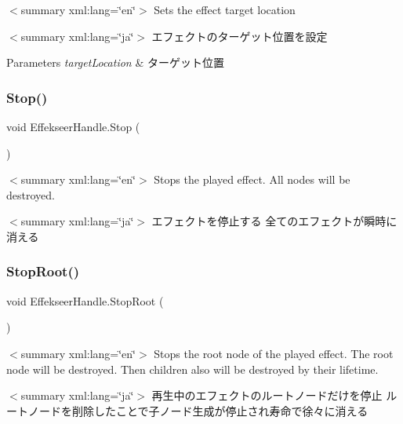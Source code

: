 $<$summary xml\+:lang=\char`\"{}en\char`\"{}$>$ Sets the effect target location 

$<$summary xml\+:lang=\char`\"{}ja\char`\"{}$>$ エフェクトのターゲット位置を設定 


\begin{DoxyParams}{Parameters}
{\em target\+Location} & ターゲット位置\\
\hline
\end{DoxyParams}
\mbox{\label{struct_effekseer_handle_add31723e9d75fad60015c48dfe1bf785}} 
\subsubsection{\texorpdfstring{Stop()}{Stop()}}
{\footnotesize\ttfamily void Effekseer\+Handle.\+Stop (\begin{DoxyParamCaption}{ }\end{DoxyParamCaption})\hspace{0.3cm}{\ttfamily [inline]}}

$<$summary xml\+:lang=\char`\"{}en\char`\"{}$>$ Stops the played effect. All nodes will be destroyed. 

$<$summary xml\+:lang=\char`\"{}ja\char`\"{}$>$ エフェクトを停止する 全てのエフェクトが瞬時に消える \mbox{\label{struct_effekseer_handle_ae16184a6f1770d63edf941941b8ad063}} 
\subsubsection{\texorpdfstring{Stop\+Root()}{StopRoot()}}
{\footnotesize\ttfamily void Effekseer\+Handle.\+Stop\+Root (\begin{DoxyParamCaption}{ }\end{DoxyParamCaption})\hspace{0.3cm}{\ttfamily [inline]}}

$<$summary xml\+:lang=\char`\"{}en\char`\"{}$>$ Stops the root node of the played effect. The root node will be destroyed. Then children also will be destroyed by their lifetime. 

$<$summary xml\+:lang=\char`\"{}ja\char`\"{}$>$ 再生中のエフェクトのルートノードだけを停止 ルートノードを削除したことで子ノード生成が停止され寿命で徐々に消える 

